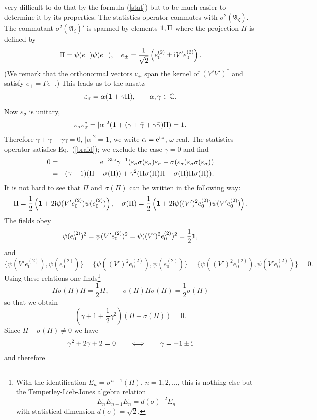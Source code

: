 \documentclass[10pt,a4paper]{article}
\begin{document}
very difficult to do that by the formula (\ref{stat})
but to be much easier to determine it by its properties.
The statistics operator commutes with
$\sigma^2(\mathfrak{A}_\zeta)$. The commutant
$\sigma^2(\mathfrak{A}_\zeta)'$ is spanned by
elements ${\bf 1},\Pi$ where the projection $\Pi$
is defined by
\[ \Pi = \psi(e_+)\psi(e_-),  \quad e_\pm=
\frac{1}{\sqrt{2}}\left( e_0^{(2)} \pm {\rm i}
V'e_0^{(2)} \right). \]
(We remark that the orthonormal vectors $e_\pm$ span
the kernel of $(V'V')^*$ and satisfy $e_+=\Gamma e_-$.)
This leads us to the ansatz
\[ \varepsilon_\sigma = \alpha ({\bf 1}+\gamma \Pi),
\qquad \alpha,\gamma \in \mathbb{C}. \]
Now $\varepsilon_\sigma$ is unitary,
\[ \varepsilon_\sigma \varepsilon_\sigma^* =
|\alpha|^2({\bf 1} + (\gamma + \bar{\gamma} +
\gamma \bar{\gamma} ) \Pi ) = {\bf 1}. \]
Therefore $\gamma + \bar{\gamma} +
\gamma \bar{\gamma}=0$, $|\alpha|^2=1$, we write
$\alpha={\rm e}^{{\rm i}\omega}$, $\omega$ real. The statistics
operator satisfies Eq.~(\ref{braid});
we exclude the case $\gamma=0$ and find
\begin{eqnarray*}
0 &=& {\rm e}^{-3{\rm i} \omega} \gamma^{-1} (\varepsilon_\sigma
\sigma(\varepsilon_\sigma) \varepsilon_\sigma -
\sigma(\varepsilon_\sigma) \varepsilon_\sigma
\sigma(\varepsilon_\sigma)) \\
&=& (\gamma+1)(\Pi-\sigma(\Pi)) + \gamma^2(\Pi
\sigma(\Pi)\Pi - \sigma(\Pi)\Pi\sigma(\Pi)).
\end{eqnarray*}
It is not hard to see that $\Pi$ and $\sigma(\Pi)$
can be written in the following way:
\[ \Pi=\frac{1}{2}\left( {\bf 1} + 2{\rm i} \psi
(V'e_0^{(2)})\psi(e_0^{(2)}) \right), \quad
\sigma(\Pi)= \frac{1}{2}\left( {\bf 1}
+ 2{\rm i} \psi((V')^2 e_0^{(2)})\psi(V'e_0^{(2)})\right). \]
The fields obey
\[ \psi(e_0^{(2)})^2 = \psi(V'e_0^{(2)})^2 =
\psi((V')^2 e_0^{(2)})^2 = \frac{1}{2} {\bf 1}, \]
and
\[ \{ \psi(V'e_0^{(2)}), \psi(e_0^{(2)}) \} =
\{ \psi((V')^2 e_0^{(2)}),\psi(e_0^{(2)}) \} =
\{ \psi((V')^2 e_0^{(2)}),\psi(V' e_0^{(2)})\}=0.\]
Using these relations one finds\footnote{With
the identification $E_n=\sigma^{n-1}(\Pi)$,
$n=1,2,\ldots$, this is nothing else but the
Temperley-Lieb-Jones algebra relation
\[ E_n E_{n\pm1} E_n = d(\sigma)^{-2} E_n \]
with statistical dimension $d(\sigma)=\sqrt{2}$.}
\[ \Pi \sigma(\Pi) \Pi = \frac{1}{2} \Pi, \qquad
\sigma(\Pi)\Pi\sigma(\Pi)=\frac{1}{2}\sigma(\Pi)\]
so that we obtain
\[ \left( \gamma + 1 + \frac{1}{2} \gamma^2 \right)
\left( \Pi - \sigma(\Pi) \right) = 0. \]
Since $\Pi-\sigma(\Pi)\neq 0$ we have
\[ \gamma^2 + 2\gamma + 2 =0 \qquad
\Longleftrightarrow \qquad \gamma = -1 \pm {\rm i} \]
and therefore
\end{document}
